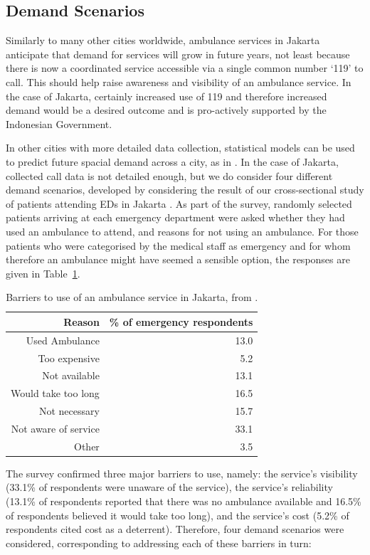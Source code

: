 \documentclass[numbers,webpdf,imaman]{ima-authoring-template}%
\begin{document}
\subsection{Demand Scenarios}\label{sec:demand_scenarios}
Similarly to many other cities worldwide, ambulance services in Jakarta
anticipate that demand for services will grow in future years, not least because
there is now a coordinated service accessible via a single common number `119'
to call. This should help raise awareness and visibility of an ambulance
service. In the case of Jakarta, certainly increased use of 119 and therefore
increased demand would be a desired outcome and is pro-actively supported
by the Indonesian Government.

In other cities with more detailed data collection, statistical
models can be used to predict future spacial demand across a city, as in
\cite{nicoletta2022bayesian}. In the case of Jakarta, collected call data is
not detailed enough, but we do
consider four different demand scenarios, developed by considering the
result of our cross-sectional study of patients attending EDs in Jakarta
\citep{BriceSyaribahNoor2022Esui}. As part of the survey, randomly selected
patients arriving at each emergency department were asked whether they had
used an ambulance to attend, and reasons for not using an ambulance. For those
patients who were categorised by the medical staff as emergency and for whom
therefore an ambulance might have seemed a sensible option, the responses are
given in Table~\ref{table:survey_results}.

\begin{table}
\centering
\begin{tabular}{rr}
\toprule
Reason & \% of emergency respondents \\
\midrule
Used Ambulance & 13.0\\
Too expensive & 5.2  \\
Not available  & 13.1 \\
Would take too long & 16.5 \\
Not necessary & 15.7  \\
Not aware of service & 33.1\\
Other &3.5 \\
\bottomrule
\end{tabular}
\caption{Barriers to use of an ambulance service in Jakarta, from
         \citet{BriceSyaribahNoor2022Esui}.}
\label{table:survey_results}
\end{table}

The survey confirmed three major barriers to use, namely: the service's
visibility (33.1\% of respondents were unaware of the service), the service's
reliability (13.1\% of respondents reported that there was no ambulance
available and 16.5\% of respondents believed it would take too long), and the
service's cost (5.2\% of respondents cited cost as a deterrent). Therefore,
four demand scenarios were considered, corresponding to addressing each of
these barriers in turn:
\end{document}
